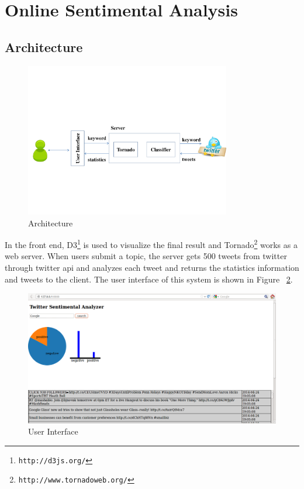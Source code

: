 \documentclass{article}
\begin{document}
\section{Online Sentimental Analysis}
\subsection{Architecture}

\begin{figure}[h!]
\centering
\includegraphics[width=0.8\textwidth]{pics/architecture.pdf}
\caption{Architecture}
\label{Fig:architecture}
\end{figure}

In the front end, D3\footnote{\texttt{\scriptsize{http://d3js.org/‎‎}}} is used to visualize the final result and Tornado\footnote{\texttt{\scriptsize{http://www.tornadoweb.org/}}} works as a web server. When users submit a topic, the server gets 500 tweets from twitter through twitter api and analyzes each tweet and returns the statistics information and tweets to the client. The user interface of this system is shown in Figure ~\ref{Fig:ui}.

\begin{figure}
\centering
\includegraphics[width=1.0\textwidth]{pics/UI.png}
\caption{User Interface}
\label{Fig:ui}
\end{figure}
\end{document}
